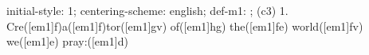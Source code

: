 initial-style: 1;
centering-scheme: english;
def-m1: \grealign;
(c3) 1. Cre([em1]f)a([em1]f)tor([em1]gv) of([em1]hg) the([em1]fe) world([em1]fv) we([em1]e) pray:([em1]d)